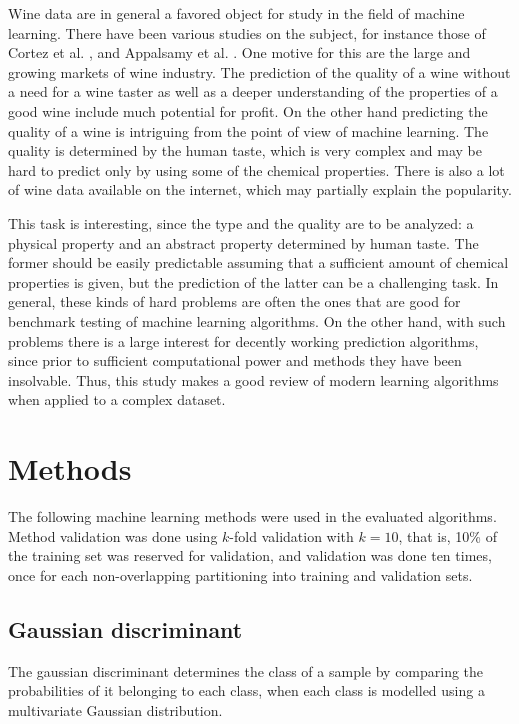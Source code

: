\documentclass[twoside]{article}
\begin{document}
\begin{multicols}{2}
Wine data are in general a favored object for study in the field of machine learning. There have been various studies
on the subject, for instance those of Cortez et al. \cite{WQA}, \cite{CorCer09} 
and Appalsamy et al. \cite{Appalsami}. One motive for this are the large and growing markets of wine industry.
The prediction of the quality of a wine without a need for a wine taster as well as a deeper understanding of the 
properties of a good wine include much potential for profit. On the other hand predicting the quality of a wine is 
intriguing from the point of view of machine learning. The quality is determined by the human taste, which is 
very complex and may be hard to predict only by using some of the chemical properties. There is also a lot of wine data available 
on the internet, which may partially explain the popularity.

This task is interesting, since the type and the quality are to be analyzed: a physical property and an abstract property determined
by human taste. The former should be easily predictable assuming that a sufficient amount of chemical
properties is given, but the prediction of the latter can be a challenging task. In general, these kinds of
hard problems are often the ones that are good for benchmark testing of machine learning algorithms. On the other
hand, with such problems there is a large interest for decently working prediction algorithms, since prior
to sufficient computational power and methods they have been insolvable. Thus, this study makes a good review of
modern learning algorithms when applied to a complex dataset.
 
\section{Methods}

The following machine learning methods were used in the evaluated algorithms.
Method validation was done using $k$-fold validation with $k = 10$,
that is, 10\% of the training set was reserved for validation, and validation
was done ten times, once for each non-overlapping partitioning into training and validation sets.

\subsection{Gaussian discriminant}

The gaussian discriminant determines the class of a sample by
comparing the probabilities of it belonging to each class, when each
class is modelled using a multivariate Gaussian distribution.


\end{multicols}
\end{document}
